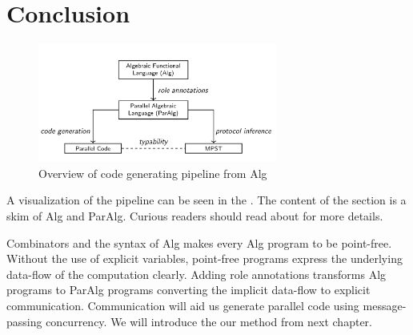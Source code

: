 \section{Conclusion}
\begin{figure}[ht]
    \centering
    \includegraphics[width=0.7\textwidth]{project/pipeline.png}
    \caption{Overview of code generating pipeline from Alg\cite{AlgebraicMultipartyProtocol}}
    \label{project:fig:pipeline}
\end{figure}
A visualization of the pipeline can be seen in the . The content of the section is a skim of Alg and ParAlg. Curious readers should read about \cite{AlgebraicMultipartyProtocol} for more details.

Combinators and the syntax of Alg makes every Alg program to be point-free. Without the use of explicit variables, point-free programs express the underlying data-flow of the computation clearly. Adding role annotations transforms Alg programs to ParAlg programs converting the implicit data-flow to explicit communication. Communication will aid us generate parallel code using message-passing concurrency. We will introduce the our method from next chapter.  